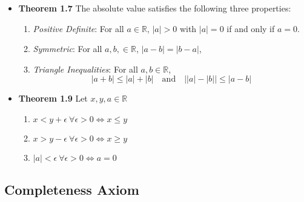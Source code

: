 \documentclass[11pt,a4paper]{article}
\begin{document}
\begin{itemize}
    \item \textbf{Theorem 1.7} The absolute value satisfies the following three properties:
        \begin{enumerate}
            \item \emph{Positive Definite}:
                For all $a \in \mathbb{R}$, $|a| > 0$ with $|a| = 0$ if and only if $a = 0$.
            \item \emph{Symmetric}:
                For all $a, b, \in \mathbb{R}$, $|a - b| = |b - a|$,
            \item \emph{Triangle Inequalities}:
                For all $a, b \in \mathbb{R}$,
                \[
                    |a + b| \leq |a| + |b| \quad \text{and}
                    \quad \left| |a| - |b| \right| \leq |a - b|
                \]
        \end{enumerate}

    \item \textbf{Theorem 1.9} Let $x, y, a \in \mathbb{R}$
        \begin{enumerate}
            \item $x < y + \epsilon \ \forall \epsilon > 0 \iff x \leq y$
            \item $x > y - \epsilon \ \forall \epsilon > 0 \iff x \geq y$
            \item $|a| < \epsilon \ \forall \epsilon > 0 \iff a = 0$
        \end{enumerate}

\end{itemize}

\subsection{Completeness Axiom}
\end{document}
